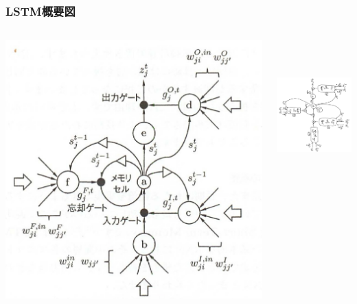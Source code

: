 \documentclass[dvipdfmx]{beamer}
\begin{document}
\begin{frame}
    \frametitle{LSTM概要図}
    \begin{columns}
        \begin{column}[T]{0.5\textwidth}
            \centering
            \includegraphics[scale=0.20]{figure/lstm.png}
        \end{column}
        \begin{column}[T]{0.5\textwidth}
            \centering
            \includegraphics[width=5.8cm, height=5.8cm]{figure/lstm_peephole.png}
        \end{column}
    \end{columns}
\end{frame}
\end{document}
